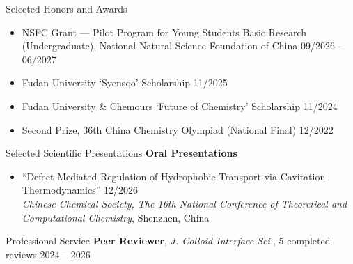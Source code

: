 \documentclass{resume} %
\begin{document}
\begin{rSection}{Selected Honors and Awards}
\begin{itemize}
  \item NSFC Grant --- Pilot Program for Young Students Basic Research (Undergraduate), National Natural Science Foundation of China \hfill 09/2026 -- 06/2027
  \item Fudan University `Syensqo' Scholarship \hfill 11/2025
  \item Fudan University \& Chemours `Future of Chemistry' Scholarship \hfill 11/2024
  \item Second Prize, 36th China Chemistry Olympiad (National Final) \hfill 12/2022
\end{itemize}
\end{rSection}

\begin{rSection}{Selected Scientific Presentations}
\textbf{Oral Presentations}
\begin{itemize}
  \item ``Defect-Mediated Regulation of Hydrophobic Transport via Cavitation Thermodynamics'' \hfill \mbox{12/2026} \\
  \textit{Chinese Chemical Society, The 16th National Conference of Theoretical and Computational Chemistry}, Shenzhen, China
\end{itemize}
\end{rSection}
\begin{rSection}{Professional Service}
\textbf{Peer Reviewer}, \textit{J. Colloid Interface Sci.}, 5 completed reviews \hfill 2024 -- 2026
\end{rSection}
\end{document}
